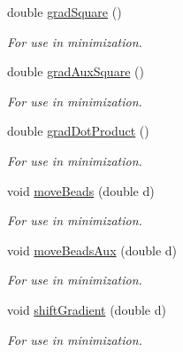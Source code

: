 \begin{DoxyCompactItemize}
\item 
double \hyperlink{classCGMethod_aa2af8a3ecad085f6c07f759bfe50ccb1}{grad\+Square} ()
\begin{DoxyCompactList}\small\item\em For use in minimization. \end{DoxyCompactList}\item 
double \hyperlink{classCGMethod_ab9c35ec6681e97472d0442a37163d46d}{grad\+Aux\+Square} ()
\begin{DoxyCompactList}\small\item\em For use in minimization. \end{DoxyCompactList}\item 
double \hyperlink{classCGMethod_a531b7d0bc38b6372dc323185f51233dc}{grad\+Dot\+Product} ()
\begin{DoxyCompactList}\small\item\em For use in minimization. \end{DoxyCompactList}\item 
void \hyperlink{classCGMethod_afe717a6a06f677933b55628ea4d0014d}{move\+Beads} (double d)
\begin{DoxyCompactList}\small\item\em For use in minimization. \end{DoxyCompactList}\item 
void \hyperlink{classCGMethod_a885a9627cc4e8b2db8f3384f29cd4069}{move\+Beads\+Aux} (double d)
\begin{DoxyCompactList}\small\item\em For use in minimization. \end{DoxyCompactList}\item 
void \hyperlink{classCGMethod_a7e8d5b8d77aff6c4564c4b1d72ab5ace}{shift\+Gradient} (double d)
\begin{DoxyCompactList}\small\item\em For use in minimization. \end{DoxyCompactList}\end{DoxyCompactItemize}


